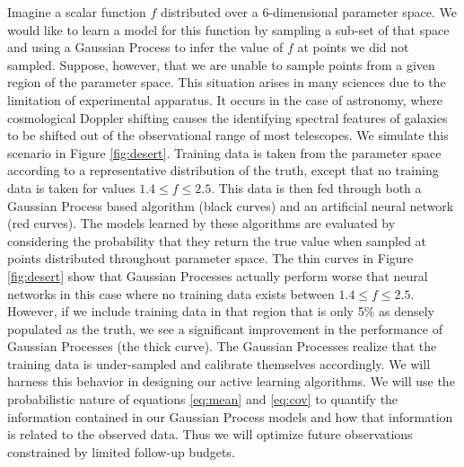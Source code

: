 \documentclass[useAMS,usenatbib,tightenlines,11pt,preprint]{aastex}
\begin{document}
Imagine a scalar function $f$ distributed over a 6-dimensional parameter space.
We would like to learn a model for this function by sampling a sub-set of that
space and using a Gaussian Process to infer the value of $f$ at points we did
not sampled.  Suppose, however, that we are unable to sample points from a given
region of the parameter space.  This situation arises in many sciences due to
the limitation of experimental apparatus.  It occurs in the case of astronomy,
where cosmological Doppler shifting causes the identifying spectral features of
galaxies to be shifted out of the observational range of most telescopes.
We simulate this scenario in Figure \ref{fig:desert}.  Training data is taken
from the parameter space according to a representative distribution of the
truth, except that no training data is taken for values $1.4\le f\le 2.5$.
This data is then fed through both a Gaussian Process based algorithm (black
curves) and an artificial neural network (red curves).  The models learned by
these algorithms are evaluated by considering the probability that they return
the true value when sampled at points distributed throughout parameter space.
The thin curves in Figure \ref{fig:desert} show that Gaussian Processes actually
perform worse that neural networks in this case where no training data exists
between $1.4\le f\le2.5$.  However, if we include training data in that region
that is only 5\% as densely populated as the truth, we see a significant
improvement in the performance of Gaussian Processes (the thick curve).  The
Gaussian Processes realize that the training data is under-sampled and calibrate
themselves accordingly.  We will harness this behavior in designing our active
learning algorithms.   We will use the probabilistic nature of equations
\ref{eq:mean} and \ref{eq:cov} to quantify the information contained in our
Gaussian Process models and how that information is related to the observed
data.  Thus we will optimize future observations constrained by limited
follow-up budgets.
\end{document}
